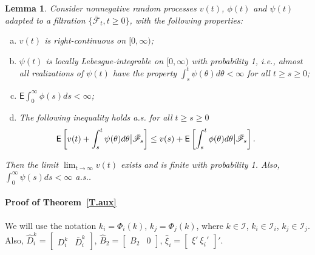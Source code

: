 \documentclass[a4paper,twocolumn]{autart}
\newtheorem{lemma}{Lemma}
\begin{document}
\begin{lemma}
  \label{Supermartingale.Lemma}
Consider nonnegative random processes $v(t)$, $\phi(t)$ and
$\psi(t)$ adapted to a filtration $\{\bar{\mathcal{F}}_t,t\ge 0\}$, with the
following properties:

\begin{enumerate}[(a)]
\item
$v(t)$ is right-continuous on $[0,\infty)$;
\item
$\psi(t)$ is locally Lebesgue-integrable on $[0,\infty)$ with probability
1, i.e., almost all realizations of $\psi(t)$ have the property $\int_s^t
\psi(\theta)d\theta <\infty$ for all $t\ge s\ge 0$;     
\item
$\mathsf{E}\int_0^\infty\phi(s)ds<\infty$;
\item
The following inequality holds a.s. for all $t\ge s\ge 0$
\begin{eqnarray}
  \label{supermart}
\hspace{-5ex}\mathsf{E}\left[v(t)+\int_s^t\psi(\theta)d\theta
    \big|\bar{\mathcal{F}}_s\right]\le v(s) +
  \mathsf{E}\left[\int_s^t\phi(\theta)d\theta\big|\bar{\mathcal{F}}_s\right].
\end{eqnarray}
\end{enumerate}
Then the limit $\lim_{t\to\infty} v(t)$ exists and is finite with
probability 1. Also, $\int_0^\infty\psi(s)ds<\infty$ a.s.. 
\end{lemma}



\paragraph*{Proof of Theorem~\ref{T.aux}}

We will use the notation
$k_i=\Phi_i(k)$, $k_j=\Phi_j(k)$, where $k\in \mathcal{I}$, $k_i\in
\mathcal{I}_i$, $k_j\in \mathcal{I}_j$. Also, 
 $\hat D_i^k=[\begin{array}{cc} D_i^k & \bar D_i^k
  \end{array}]$, 
$\hat B_2=[\begin{array}{cc} B_2 & 0
  \end{array}]$, $\hat \xi_i=[\begin{array}{c} \xi'~\xi_i'
  \end{array}]'$. 
\end{document}
